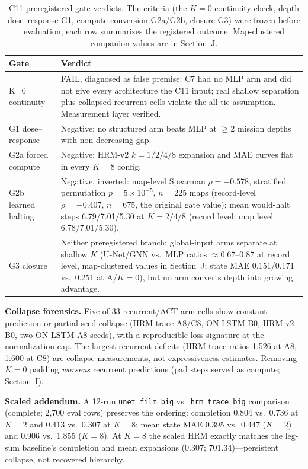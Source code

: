 \documentclass[letterpaper]{article} %
\newcommand{\stage}[1]{\textsc{#1}}
\begin{document}
\begin{table}[t]
\centering
\footnotesize
\begin{tabular}{@{}lp{5.2cm}@{}}
\toprule
Gate & Verdict \\
\midrule
K=0 continuity & FAIL, diagnosed as false premise: \stage{C7} had no MLP arm and did not give every architecture the \stage{C11} input; real shallow separation plus collapsed recurrent cells violate the all-tie assumption. Measurement layer verified. \\
G1 dose--response & Negative: no structured arm beats MLP at $\geq$2 mission depths with non-decreasing gap. \\
G2a forced compute & Negative: HRM-v2 $k{=}1/2/4/8$ expansion and MAE curves flat in every $K{=}8$ config. \\
G2b learned halting & Negative, inverted: map-level Spearman $\rho{=}-0.578$, stratified permutation $p{=}5{\times}10^{-5}$, $n{=}225$ maps (record-level $\rho{=}-0.407$, $n{=}675$, the original gate value); mean would-halt steps 6.79/7.01/5.30 at $K{=}2/4/8$ (record level; map level 6.78/7.01/5.30). \\
G3 closure & Neither preregistered branch: global-input arms separate at shallow $K$ (U-Net/GNN vs.\ MLP ratios $\approx$0.67--0.87 at record level, map-clustered values in Section~J; state MAE 0.151/0.171 vs.\ 0.251 at A/$K{=}0$), but no arm converts depth into growing advantage. \\
\bottomrule
\end{tabular}
\caption{\stage{C11} preregistered gate verdicts. The criteria (the $K{=}0$ continuity check, depth dose--response G1, compute conversion G2a/G2b, closure G3) were frozen before evaluation; each row summarizes the registered outcome. Map-clustered companion values are in Section~J.}
\label{tab:c11gates}
\end{table}

\textbf{Collapse forensics.} Five of 33 recurrent/ACT arm-cells show constant-prediction or partial seed collapse (HRM-trace A8/C8, ON-LSTM B0, HRM-v2 B0, two ON-LSTM A8 seeds), with a reproducible loss signature at the normalization cap. The largest recurrent deficits (HRM-trace ratios 1.526 at A8, 1.600 at C8) are collapse measurements, not expressiveness estimates. Removing $K{=}0$ padding \emph{worsens} recurrent predictions (pad steps served as compute; Section~I).

\textbf{Scaled addendum.} A 12-run \texttt{unet\_film\_big} vs.\ \texttt{hrm\_trace\_big} comparison (complete; 2{,}700 eval rows) preserves the ordering: completion 0.804 vs.\ 0.736 at $K{=}2$ and 0.413 vs.\ 0.307 at $K{=}8$; mean state MAE 0.395 vs.\ 0.447 ($K{=}2$) and 0.906 vs.\ 1.855 ($K{=}8$). At $K{=}8$ the scaled HRM exactly matches the leg-sum baseline's completion and mean expansions (0.307; 701.34)---persistent collapse, not recovered hierarchy.
\end{document}
